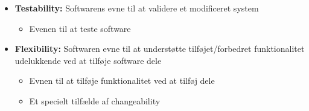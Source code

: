 \documentclass[a4, english]{article}
\begin{document}
\begin{itemize}
  \item \textbf{Testability:} Softwarens evne til at validere et modificeret system
  \begin{itemize}
  	\item Evenen til at teste software
  \end{itemize}
  \item \textbf{Flexibility:} Softwaren evne til at understøtte tilføjet/forbedret funktionalitet udelukkende ved at tilføje software dele
  \begin{itemize}
  	\item Evnen til at tilføje funktionalitet ved at tilføj dele
    \item Et specielt tilfælde af changeability
  \end{itemize}

\end{itemize}
\end{document}
